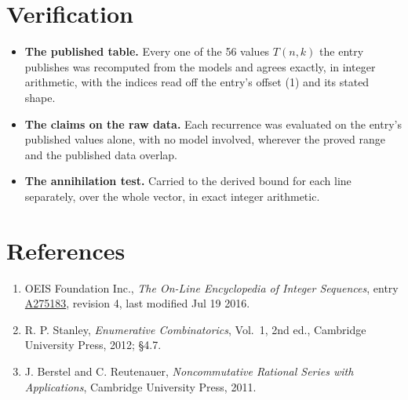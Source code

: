 \documentclass[11pt]{article}
\theoremstyle{definition}
\begin{document}
\section{Verification}

\begin{itemize}

\item {\bfseries The published table.} Every one of the 56 values $T(n,k)$ the entry publishes was recomputed from the models and agrees exactly, in integer arithmetic, with the indices read off the entry's offset (1) and its stated shape.

\item {\bfseries The claims on the raw data.} Each recurrence was evaluated on the entry's published values alone, with no model involved, wherever the proved range and the published data overlap.

\item {\bfseries The annihilation test.} Carried to the derived bound for each line separately, over the whole vector, in exact integer arithmetic.

\end{itemize}

\section{References}

\begin{enumerate}

\item OEIS Foundation Inc., \emph{The On-Line Encyclopedia of Integer Sequences}, entry \href{https://oeis.org/A275183}{A275183}, revision 4, last modified Jul 19 2016.

\item R. P. Stanley, \emph{Enumerative Combinatorics}, Vol.~1, 2nd ed., Cambridge University Press, 2012; \S4.7.

\item J. Berstel and C. Reutenauer, \emph{Noncommutative Rational Series with Applications}, Cambridge University Press, 2011.

\end{enumerate}
\end{document}
